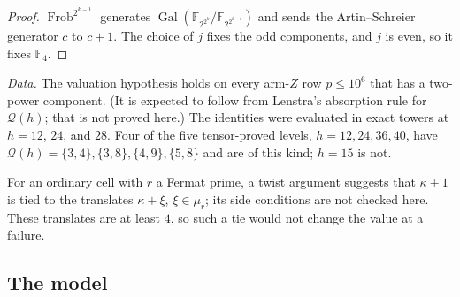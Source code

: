 \begin{proof}
$\operatorname{Frob}^{2^{k-1}}$ generates
$\operatorname{Gal}(\mathbb F_{2^{2^k}}/\mathbb F_{2^{2^{k-1}}})$ and sends the
Artin--Schreier generator $c$ to $c+1$.  The choice of $j$ fixes the odd
components, and $j$ is even, so it fixes $\mathbb F_4$.
\end{proof}

\noindent\emph{Data.}  The valuation hypothesis holds on every arm-$Z$ row
$p\leq10^6$ that has a two-power component.  (It is expected to follow from
Lenstra's absorption rule for $\mathcal Q(h)$; that is not proved here.)  The
identities were evaluated in exact towers at $h=12$, $24$, and $28$.  Four of
the five tensor-proved levels, $h=12,24,36,40$, have
$\mathcal Q(h)=\{3,4\},\{3,8\},\{4,9\},\{5,8\}$ and are of this kind; $h=15$
is not.

For an ordinary cell with $r$ a Fermat prime, a twist argument suggests that
$\kappa+1$ is tied to the translates $\kappa+\xi$, $\xi\in\mu_r$; its side
conditions are not checked here.  These translates are at least $4$, so such
a tie would not change the value at a failure.

\subsection{The model}\label{sec:model-def}

